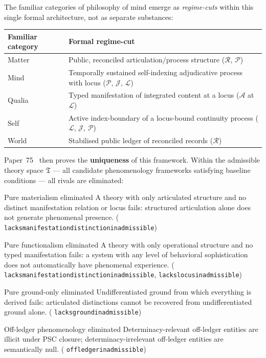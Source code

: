 \documentclass[11pt]{article}
\theoremstyle{remark}
\newcommand{\lean}[1]{%
  \penalty-100
  \begingroup\def\_{\textunderscore\allowbreak}\texttt{#1}\endgroup}
\newcommand{\OntR}{\mathcal{R}}
\newcommand{\OntP}{\mathcal{P}}
\newcommand{\OntJ}{\mathcal{J}}
\newcommand{\OntL}{\mathcal{L}}
\newcommand{\OntA}{\mathcal{A}}
\begin{document}
The familiar categories of philosophy of mind emerge as \emph{regime-cuts} within
this single formal architecture, not as separate substances:

\begin{center}
\small
\begin{tabular}{@{}ll@{}}
\toprule
\textbf{Familiar category} & \textbf{Formal regime-cut} \\
\midrule
Matter   & Public, reconciled articulation/process structure ($\OntR$, $\OntP$) \\
Mind     & Temporally sustained self-indexing adjudicative process with locus ($\OntP$, $\OntJ$, $\OntL$) \\
Qualia   & Typed manifestation of integrated content at a locus ($\OntA$ at $\OntL$) \\
Self     & Active index-boundary of a locus-bound continuity process ($\OntL$, $\OntJ$, $\OntP$) \\
World    & Stabilised public ledger of reconciled records ($\OntR$) \\
\bottomrule
\end{tabular}
\end{center}

Paper~75~\cite{SpivackNEMS75} then proves the \textbf{uniqueness} of this framework.
Within the admissible theory space $\mathfrak{T}$ --- all candidate phenomenology
frameworks satisfying baseline conditions --- all rivals are eliminated:

\medskip
\begin{termlist}
  \item[Pure materialism eliminated]
    A theory with only articulated structure and no distinct manifestation relation or
    locus fails: structured articulation alone does not generate phenomenal presence.
    (\lean{lacks\_manifestation\allowbreak\_distinction\_inadmissible})

  \item[Pure functionalism eliminated]
    A theory with only operational structure and no typed manifestation fails: a system
    with any level of behavioral sophistication does not automatically have phenomenal
    experience. (\lean{lacks\_manifestation\allowbreak\_distinction\_inadmissible},
    \lean{lacks\_locus\_inadmissible})

  \item[Pure ground-only eliminated]
    Undifferentiated ground from which everything is derived fails: articulated
    distinctions cannot be recovered from undifferentiated ground alone.
    (\lean{lacks\_ground\_inadmissible})

  \item[Off-ledger phenomenology eliminated]
    Determinacy-relevant off-ledger entities are illicit under PSC closure;
    determinacy-irrelevant off-ledger entities are semantically null.
    (\lean{off\_ledger\_inadmissible})
\end{termlist}
\end{document}
